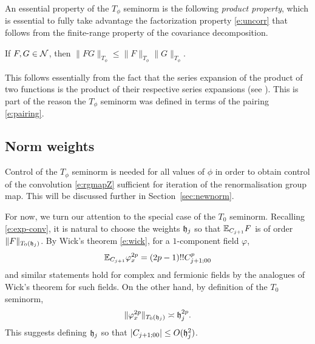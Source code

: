 An essential property of the $T_\phi$ seminorm is the following \emph{product property},
which is essential to fully take advantage the factorization property \eqref{e:uncorr}
that follows from the finite-range property of the covariance decomposition.

\begin{prop}
\label{prop:prod}
If $F, G \in \mathcal{N}$, then $\|F G\|_{T_\phi} \le \|F\|_{T_\phi} \|G\|_{T_\phi}$.
\end{prop}

\begin{rk}
This follows essentially from the fact that
the series expansion of the product of two functions is the product of their
respective series expansions (see \cite{BS-rg-norm}). This is part of the reason
the $T_\phi$ seminorm was defined in terms of the pairing \eqref{e:pairing}.
\end{rk}


\subsection{Norm weights}
\label{sec:weights}

Control of the $T_\phi$ seminorm is needed for all values of
$\phi$ in order to obtain control of the convolution \eqref{e:rgmapZ} sufficient
for iteration of the renormalisation group map.
This will be discussed further in Section~\ref{sec:newnorm}.

For now, we turn our attention to the special case of the $T_0$ seminorm. Recalling
\eqref{e:exp-conv}, it is natural to choose the weights $\mathfrak{h}_j$ so that
$\mathbb{E}_{C_{j+1}} F$ is of order $\|F\|_{T_0(\mathfrak{h}_j)}$.
By Wick's theorem \eqref{e:wick}, for a $1$-component field $\varphi$,
\begin{equation}
\mathbb{E}_{C_{j+1}} \varphi_x^{2p} = (2p - 1)!! C_{j+1;00}^p
\end{equation}
and similar statements hold for complex and fermionic fields by the analogues of
Wick's theorem for such fields.
On the other hand, by definition of the $T_0$ seminorm,
\begin{equation}
\label{e:gauss-moments}
\|\varphi_x^{2p}\|_{T_0(\mathfrak{h}_j)} \asymp \mathfrak{h}_j^{2p}.
\end{equation}
This suggests defining $\mathfrak{h}_j$ so that $|C_{j+1;00}| \le O(\mathfrak{h}^2_j)$.

